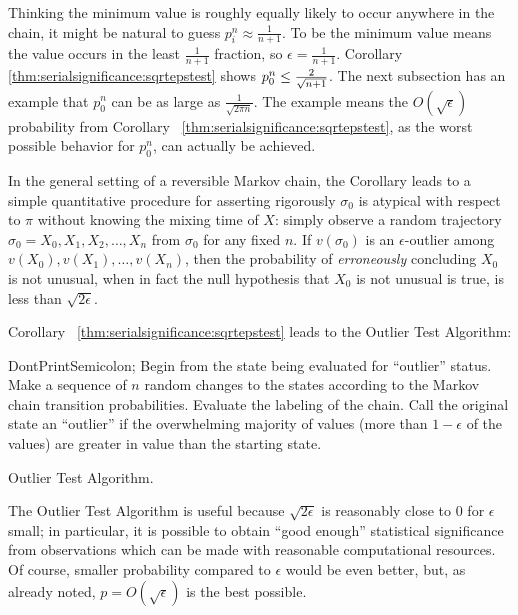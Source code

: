 \documentclass[12pt]{article}
\begin{document}
\begin{example}
Thinking the minimum value is roughly equally likely to occur anywhere
in the chain, it might be natural to guess \( p_i^n \approx \frac{1}{n+1}
\).  To be the minimum value means the value occurs in the least \(
\frac{1}{n+1} \) fraction, so \( \epsilon = \frac {1}{n+1} \).
Corollary~%
\ref{thm:serialsignificance:sqrtepstest} shows \( p_0^n \le \frac{2}{\sqrt
{%
n+1}} \).  The next subsection has an example that \( p_0^n \) can be as
large as \( \frac{1}{\sqrt{2\pi n}} \).  The example means the \( O (\sqrt
{\epsilon}) \) probability from Corollary~%
\ref{thm:serialsignificance:sqrtepstest}, as the worst possible behavior
for \( p_0^n \), can actually be achieved.

In the general setting of a reversible Markov chain, the Corollary leads
to a simple quantitative procedure for asserting rigorously \( \sigma_0 \)
is atypical with respect to \( \pi \) without knowing the mixing time of
\( X \):  simply observe a random trajectory \( \sigma_0 = X_0 , X_1, X_2,
\dots, X_n \) from \( \sigma_0 \) for any fixed \( n \).  If \( v(\sigma_0
) \) is an \( \epsilon \)-outlier among \( v(X_0), v(X_1), \dots, v(X_n)
\), then the probability of \emph{erroneously} concluding \( X_0 \) is
not unusual, when in fact the null hypothesis that \( X_0 \) is not
unusual is true, is less than \( \sqrt{2 \epsilon } \).

Corollary~%
\ref{thm:serialsignificance:sqrtepstest} leads to the Outlier Test
Algorithm:%

\begin{algorithm}[H]
    DontPrintSemicolon;   Begin from
    the state being evaluated for ``outlier'' status.\; Make a sequence
    of \( n \) random changes to the states according to the Markov
    chain transition probabilities.\; Evaluate the labeling of the
    chain.\; Call the original state an ``outlier'' if the overwhelming
    majority of values (more than \( 1 - \epsilon \) of the values) are
    greater in value than the starting state.\;
    \caption{Outlier Test Algorithm.}
\end{algorithm}

\begin{remark}
    The Outlier Test Algorithm is useful because \( \sqrt{2\epsilon} \)
    is reasonably close to \( 0 \) for \( \epsilon \) small; in
    particular, it is possible to obtain ``good enough'' statistical
    significance from observations which can be made with reasonable
    computational resources. Of course, smaller probability compared to \(
    \epsilon \) would be even better, but, as already noted, \( p = O(\sqrt
    {\epsilon}) \) is the best possible.
\end{remark}


\end{example}
\end{document}
